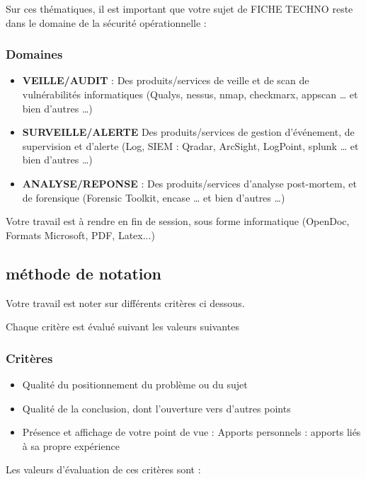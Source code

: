 Sur ces thématiques, il est important que votre sujet de FICHE TECHNO reste dans le domaine de la sécurité opérationnelle :

\begin{frame}
\frametitle<presentation>{Domaines}
\begin{itemize}
  \item \textbf{VEILLE/AUDIT} : Des produits/services de veille et de scan de vulnérabilités informatiques (Qualys, nessus, nmap, checkmarx, appscan … et bien d’autres …) 
  \item \textbf{SURVEILLE/ALERTE} Des produits/services de gestion d’événement, de supervision et d’alerte (Log, SIEM : Qradar, ArcSight, LogPoint, splunk … et bien d’autres …)
  \item \textbf{ANALYSE/REPONSE} : Des produits/services d’analyse post-mortem, et de forensique (Forensic Toolkit, encase … et bien d’autres …)
\end{itemize}

\end{frame}

Votre travail est à rendre en fin de session, sous forme informatique (OpenDoc, Formats Microsoft, PDF, Latex...)

\subsection{méthode de notation}

Votre travail est noter sur différents critères ci dessous.



Chaque critère est évalué suivant les valeurs suivantes

\begin{frame}
\frametitle<presentation>{Critères}

\begin{itemize}
  \item Qualité du positionnement du problème ou du sujet
  \item Qualité de la conclusion, dont l'ouverture vers d'autres points
  \item Présence et affichage de votre point de vue : Apports personnels : apports liés à sa propre expérience
\end{itemize}

\end{frame}
Les valeurs d'évaluation de ces critères sont :

